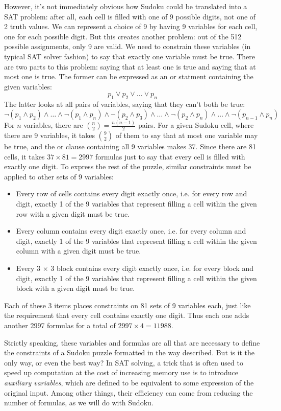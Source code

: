 \documentclass{article}
\begin{document}
However, it's not immediately obvious
how Sudoku could be translated into a SAT problem:
after all, each cell is filled with one of 9 possible digits,
not one of 2 truth values.
We can represent a choice of 9 by having 9 variables for each cell,
one for each possible digit.
But this creates another problem:
out of the 512 possible assignments, only 9 are valid.
We need to constrain these variables (in typical SAT solver fashion)
to say that exactly one variable must be true.
There are two parts to this problem:
saying that at least one is true
and saying that at most one is true.
The former can be expressed as an or statment containing the given variables:
\[p_1 \lor p_2 \lor \ldots \lor p_n\]
The latter looks at all pairs of variables,
saying that they can't both be true:
\[\lnot (p_1 \land p_2) \land \ldots \land \lnot (p_1 \land p_n)
\land \lnot (p_2 \land p_3) \land \ldots \land \lnot (p_2 \land p_n) \land \ldots
\land \lnot (p_{n-1} \land p_n)\]
For $n$ variables, there are $\binom{n}{2} = \frac{n(n-1)}{2}$ pairs.
For a given Sudoku cell, where there are 9 variables,
it takes $\binom{9}{2}$ of them
to say that at most one variable may be true,
and the or clause containing all 9 variables makes 37.
Since there are 81 cells,
it takes $37 \times 81 = 2997$ formulas
just to say that every cell is filled with exactly one digit.
To express the rest of the puzzle,
similar constraints must be applied to other sets of 9 variables:
\begin{itemize}
\item
  Every row of cells contains every digit exactly once,
  i.e. for every row and digit,
  exactly 1 of the 9 variables that represent
  filling a cell within the given row with a given digit
  must be true.
\item
  Every column contains every digit exactly once,
  i.e. for every column and digit,
  exactly 1 of the 9 variables that represent
  filling a cell within the given column with a given digit
  must be true.
\item
  Every 3 $\times$ 3 block contains every digit exactly once,
  i.e. for every block and digit,
  exactly 1 of the 9 variables that represent
  filling a cell within the given block with a given digit
  must be true.
\end{itemize}
Each of these 3 items places constraints on 81 sets of 9 variables each,
just like the requirement that every cell contains exactly one digit.
Thus each one adds another 2997 formulas
for a total of $2997 \times 4 = 11988$.

Strictly speaking, these variables and formulas are all that are necessary
to define the constraints of a Sudoku puzzle
formatted in the way described.
But is it the only way, or even the best way?
In SAT solving, a trick that is often used to speed up computation
at the cost of increasing memory use
is to introduce \textit{auxiliary variables},
which are defined to be equivalent to some expression of the original input.
Among other things,
their efficiency can come from reducing the number of formulas,
as we will do with Sudoku.
\end{document}
